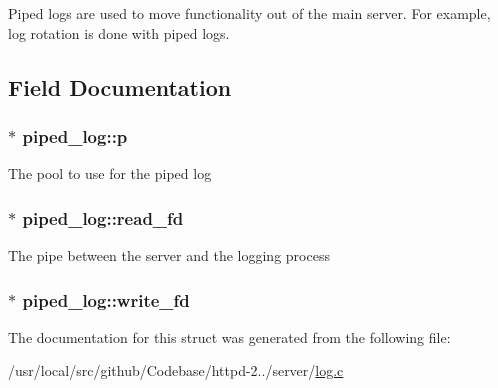 Piped logs are used to move functionality out of the main server. For example, log rotation is done with piped logs. 

\subsection{Field Documentation}
\subsubsection[{\texorpdfstring{p}{p}}]{$\ast$ piped\+\_\+log\+::p}\hypertarget{structpiped__log_a9435653f8fa72502a33f80b49a779921}{}\label{structpiped__log_a9435653f8fa72502a33f80b49a779921}
The pool to use for the piped log 
\subsubsection[{\texorpdfstring{read\+\_\+fd}{read_fd}}]{$\ast$ piped\+\_\+log\+::read\+\_\+fd}\hypertarget{structpiped__log_aa193ff18ec135bf198fb611a1d93e049}{}\label{structpiped__log_aa193ff18ec135bf198fb611a1d93e049}
The pipe between the server and the logging process 
\subsubsection[{\texorpdfstring{write\+\_\+fd}{write_fd}}]{ $\ast$ piped\+\_\+log\+::write\+\_\+fd}\hypertarget{structpiped__log_a1c3a44a4343ad621d424d28f3ae31a4a}{}\label{structpiped__log_a1c3a44a4343ad621d424d28f3ae31a4a}


The documentation for this struct was generated from the following file\+:\begin{DoxyCompactItemize}
\item 
/usr/local/src/github/\+Codebase/httpd-\/2../server/\hyperlink{log_8c}{log.\+c}\end{DoxyCompactItemize}
